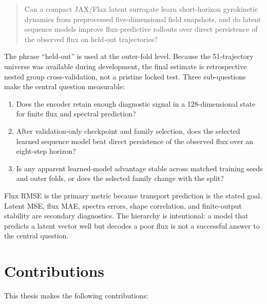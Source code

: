 \begin{quote}
Can a compact JAX/Flax latent surrogate learn short-horizon gyrokinetic dynamics from
preprocessed five-dimensional field snapshots, and do latent sequence models improve
flux-predictive rollouts over direct persistence of the observed flux on held-out trajectories?
\end{quote}

The phrase ``held-out'' is used at the outer-fold level. Because the 51-trajectory universe was
available during development, the final estimate is retrospective nested group cross-validation,
not a pristine locked test. Three sub-questions make the central question measurable:

\begin{enumerate}[label=RQ\arabic*]
  \item Does the encoder retain enough diagnostic signal in a 128-dimensional state for finite
        flux and spectral prediction?
  \item After validation-only checkpoint and family selection, does the selected learned sequence
        model beat direct persistence of the observed flux over an eight-step horizon?
  \item Is any apparent learned-model advantage stable across matched training seeds and outer
        folds, or does the selected family change with the split?
\end{enumerate}

Flux RMSE is the primary metric because transport prediction is the stated goal. Latent MSE,
flux MAE, spectra errors, shape correlation, and finite-output stability are secondary diagnostics.
The hierarchy is intentional: a model that predicts a latent vector well but decodes a poor flux is
not a successful answer to the central question.

\section{Contributions}

This thesis makes the following contributions:

